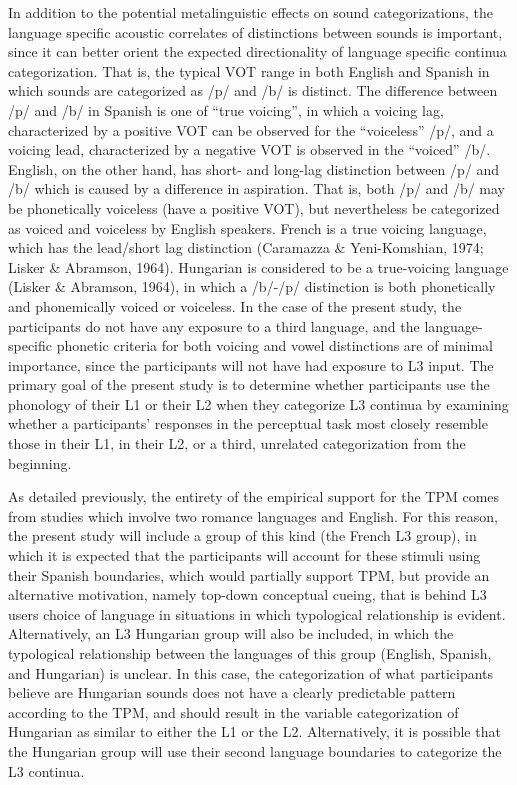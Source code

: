 \documentclass[
  man]{apa6}
\begin{document}
In addition to the potential metalinguistic effects on sound categorizations, the language specific acoustic correlates of distinctions between sounds is important, since it can better orient the expected directionality of language specific continua categorization. That is, the typical VOT range in both English and Spanish in which sounds are categorized as /p/ and /b/ is distinct. The difference between /p/ and /b/ in Spanish is one of ``true voicing'', in which a voicing lag, characterized by a positive VOT can be observed for the ``voiceless'' /p/, and a voicing lead, characterized by a negative VOT is observed in the ``voiced'' /b/.
English, on the other hand, has short- and long-lag distinction between /p/ and /b/ which is caused by a difference in aspiration. That is, both /p/ and /b/ may be phonetically voiceless (have a positive VOT), but nevertheless be categorized as voiced and voiceless by English speakers.
French is a true voicing language, which has the lead/short lag distinction (Caramazza \& Yeni-Komshian, 1974; Lisker \& Abramson, 1964). Hungarian is considered to be a true-voicing language (Lisker \& Abramson, 1964), in which a /b/-/p/ distinction is both phonetically and phonemically voiced or voiceless. In the case of the present study, the participants do not have any exposure to a third language, and the language-specific phonetic criteria for both voicing and vowel distinctions are of minimal importance, since the participants will not have had exposure to L3 input. The primary goal of the present study is to determine whether participants use the phonology of their L1 or their L2 when they categorize L3 continua by examining whether a participants' responses in the perceptual task most closely resemble those in their L1, in their L2, or a third, unrelated categorization from the beginning.

As detailed previously, the entirety of the empirical support for the TPM comes from studies which involve two romance languages and English.
For this reason, the present study will include a group of this kind (the French L3 group), in which it is expected that the participants will account for these stimuli using their Spanish boundaries, which would partially support TPM, but provide an alternative motivation, namely top-down conceptual cueing, that is behind L3 users choice of language in situations in which typological relationship is evident.
Alternatively, an L3 Hungarian group will also be included, in which the typological relationship between the languages of this group (English, Spanish, and Hungarian) is unclear.
In this case, the categorization of what participants believe are Hungarian sounds does not have a clearly predictable pattern according to the TPM, and should result in the variable categorization of Hungarian as similar to either the L1 or the L2. Alternatively, it is possible that the Hungarian group will use their second language boundaries to categorize the L3 continua.
\end{document}
